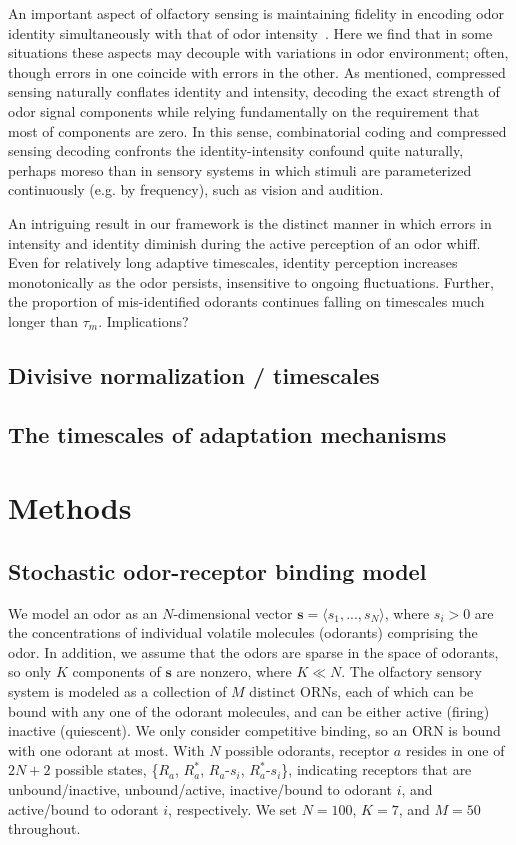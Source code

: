 An important aspect of olfactory sensing is maintaining fidelity in encoding odor identity simultaneously with that of odor intensity~\cite{Laruents papers}. Here we find that in some situations these aspects may decouple with variations in odor environment; often, though errors in one coincide with errors in the other. As mentioned, compressed sensing naturally conflates identity and intensity, decoding the exact strength of odor signal components while relying fundamentally on the requirement that most of components are zero. In this sense, combinatorial coding and compressed sensing decoding confronts the identity-intensity confound quite naturally, perhaps moreso than in sensory systems in which stimuli are parameterized continuously (e.g. by frequency), such as vision and audition.

An intriguing result in our framework is the distinct manner in which errors in intensity and identity diminish during the active perception of an odor whiff. Even for relatively long adaptive timescales, identity perception increases monotonically as the odor persists, insensitive to ongoing fluctuations. Further, the proportion of mis-identified odorants continues falling on timescales much longer than $\tau_m$. {\color{blue} Implications?}


\subsection{Divisive normalization / timescales}


\subsection{The timescales of adaptation mechanisms}




\section{Methods}

\subsection{Stochastic odor-receptor binding model}

We model an odor as an $N$-dimensional vector $\mathbf s = \langle s_1,...,s_N\rangle$, where $s_i > 0$ are the concentrations of individual volatile molecules (odorants) comprising the odor. In addition, we assume that the odors are sparse in the space of odorants, so only $K$ components of $\mathbf s$ are nonzero, where $K \ll N$. The olfactory sensory system is modeled as a collection of $M$ distinct ORNs, each of which can be bound with any one of the odorant molecules, and can be either active (firing) inactive (quiescent). We only consider competitive binding, so an ORN is bound with one odorant at most. With $N$ possible odorants, receptor $a$ resides in one of $2N+2$ possible states, \{$R_a$, $R^*_a$, $R_a$-$s_i$, $R^*_a$-$s_i$\}, indicating receptors that are unbound/inactive, unbound/active, inactive/bound to odorant $i$, and active/bound to odorant $i$, respectively. We set $N = 100$, $K = 7$, and $M = 50$ throughout. 

